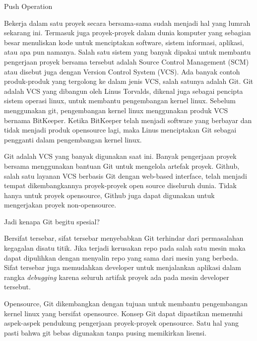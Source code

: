 
\sloppy
\begin{center}{\fontsize{16pt}{16pt}\selectfont Push Operation \\}\end{center} \par
Bekerja dalam satu proyek secara bersama-sama sudah menjadi hal yang lumrah sekarang ini. Termasuk juga proyek-proyek dalam dunia komputer yang sebagian besar menuliskan kode untuk menciptakan software, sistem informasi, aplikasi, atau apa pun namanya. Salah satu sistem yang banyak dipakai untuk membantu pengerjaan proyek bersama tersebut adalah Source Control Management (SCM) atau disebut juga dengan Version Control System (VCS). Ada banyak contoh produk-produk yang tergolong ke dalam jenis VCS, salah satunya adalah Git. Git adalah VCS yang dibangun oleh Linus Torvalds, dikenal juga sebagai pencipta sistem operasi linux, untuk membantu pengembangan kernel linux. Sebelum menggunakan git, pengembangan kernel linux menggunakan produk VCS bernama BitKeeper. Ketika BitKeeper telah menjadi software yang berbayar dan tidak menjadi produk opensource lagi, maka Linus menciptakan Git sebagai pengganti dalam pengembangan kernel linux. \par
Git adalah VCS yang banyak digunakan saat ini. Banyak pengerjaan proyek bersama menggunakan bantuan Git untuk mengelola artefak proyek. Github, salah satu layanan VCS berbasis Git dengan web-based interface, telah menjadi tempat dikembangkannya proyek-proyek open source diseluruh dunia. Tidak hanya untuk proyek opensource, Github juga dapat digunakan untuk mengerjakan proyek non-opensource. \par
\noindent 
Jadi kenapa Git begitu spesial? \par
\noindent 
Bersifat tersebar, sifat tersebar menyebabkan Git terhindar dari permasalahan kegagalan disatu titik. Jika terjadi kerusakan repo pada salah satu mesin maka dapat dipulihkan dengan menyalin repo yang sama dari mesin yang berbeda. Sifat tersebar juga memudahkan developer untuk menjalankan aplikasi dalam rangka \textit{debugging $  $}karena seluruh artifak proyek ada pada mesin developer tersebut. \par
\noindent 
Opensource, Git dikembangkan dengan tujuan untuk membantu pengembangan kernel linux yang bersifat opensource. Konsep Git dapat dipastikan memenuhi aspek-aspek pendukung pengerjaan proyek-proyek opensource. Satu hal yang pasti bahwa git bebas digunakan tanpa pusing memikirkan lisensi. \par
\noindent 
